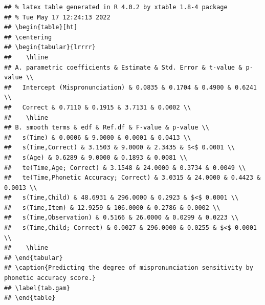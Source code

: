 \documentclass[
]{article}
\begin{document}
\begin{verbatim}
## % latex table generated in R 4.0.2 by xtable 1.8-4 package
## % Tue May 17 12:24:13 2022
## \begin{table}[ht]
## \centering
## \begin{tabular}{lrrrr}
##    \hline
## A. parametric coefficients & Estimate & Std. Error & t-value & p-value \\ 
##   Intercept (Mispronunciation) & 0.0835 & 0.1704 & 0.4900 & 0.6241 \\ 
##   Correct & 0.7110 & 0.1915 & 3.7131 & 0.0002 \\ 
##    \hline
## B. smooth terms & edf & Ref.df & F-value & p-value \\ 
##   s(Time) & 0.0006 & 9.0000 & 0.0001 & 0.0413 \\ 
##   s(Time,Correct) & 3.1503 & 9.0000 & 2.3435 & $<$ 0.0001 \\ 
##   s(Age) & 0.6289 & 9.0000 & 0.1893 & 0.0081 \\ 
##   te(Time,Age; Correct) & 3.1548 & 24.0000 & 0.3734 & 0.0049 \\ 
##   te(Time,Phonetic Accuracy; Correct) & 3.0315 & 24.0000 & 0.4423 & 0.0013 \\ 
##   s(Time,Child) & 48.6931 & 296.0000 & 0.2923 & $<$ 0.0001 \\ 
##   s(Time,Item) & 12.9259 & 106.0000 & 0.2786 & 0.0002 \\ 
##   s(Time,Observation) & 0.5166 & 26.0000 & 0.0299 & 0.0223 \\ 
##   s(Time,Child; Correct) & 0.0027 & 296.0000 & 0.0255 & $<$ 0.0001 \\ 
##    \hline
## \end{tabular}
## \caption{Predicting the degree of mispronunciation sensitivity by phonetic accuracy score.} 
## \label{tab.gam}
## \end{table}
\end{verbatim}
\end{document}
